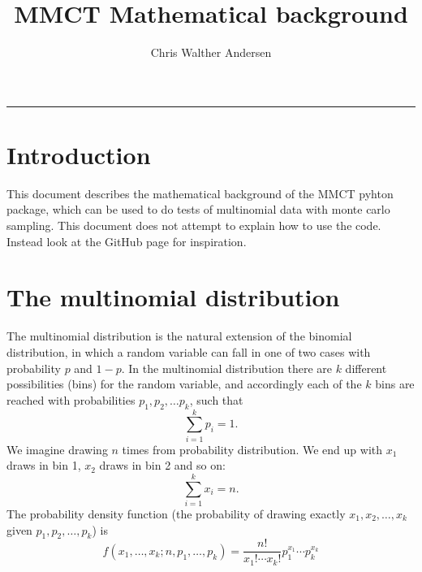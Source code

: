 \documentclass[a4paper,article]{memoir}
\title{MMCT Mathematical background}
\author{Chris Walther Andersen}
\begin{document}
	
\setlength{\parindent}{0pt}

\maketitle
\fancybreak{$*\quad*\quad*$}
\vspace{5mm}

\chapter{Introduction}
This document describes the mathematical background of the MMCT pyhton package, 
which can be used to do tests of multinomial data with monte carlo sampling. 
This document does not attempt to explain how to use the code. Instead look at 
the GitHub page for inspiration.

\chapter{The multinomial distribution}
The multinomial distribution is the natural extension of the binomial 
distribution, in which a random variable can fall in one of two cases with 
probability $p$ and $1-p$. In the multinomial distribution there are $k$ 
different possibilities (bins) for the random variable, and accordingly each of 
the 
$k$ bins are reached with probabilities $p_1, p_2, \ldots p_k$, such 
that
\begin{equation}
	\sum_{i=1}^k p_i = 1.
\end{equation}
We imagine drawing $n$ times from probability distribution. We end up with 
$x_1$ draws in bin 1, $x_2$ draws in bin 2 and so on:
\begin{equation}
	\sum_{i=1}^k x_i = n.
\end{equation}
The probability density function (the probability of drawing exactly $x_1, x_2, 
\ldots, x_k$ given $p_1, p_2, \ldots, p_k$) is
\begin{equation}
	f(x_1,\ldots, x_k;n,p_1,\ldots,p_k) = \frac{n!}{x_1! \cdots x_k!} p_1^{x_1} 
	\cdots p_k^{x_k}
\end{equation}

 


	
	
\end{document}
